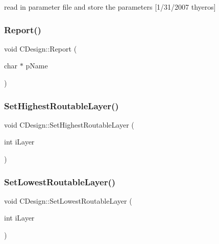 read in parameter file and store the parameters \mbox{[}1/31/2007 thyeros\mbox{]} 

\mbox{\label{classCDesign_a0cbed390d0e0c05776aed59c16f7982c}} 
\subsubsection{\texorpdfstring{Report()}{Report()}}
{\footnotesize\ttfamily void C\+Design\+::\+Report (\begin{DoxyParamCaption}\item[{char $\ast$}]{p\+Name }\end{DoxyParamCaption})}

\mbox{\label{classCDesign_a4dda519df38cb104e804522f76d826fe}} 
\subsubsection{\texorpdfstring{SetHighestRoutableLayer()}{SetHighestRoutableLayer()}}
{\footnotesize\ttfamily void C\+Design\+::\+Set\+Highest\+Routable\+Layer (\begin{DoxyParamCaption}\item[{int}]{i\+Layer }\end{DoxyParamCaption})}

\mbox{\label{classCDesign_af7d386170d501eb471b63b2f663690b0}} 
\subsubsection{\texorpdfstring{SetLowestRoutableLayer()}{SetLowestRoutableLayer()}}
{\footnotesize\ttfamily void C\+Design\+::\+Set\+Lowest\+Routable\+Layer (\begin{DoxyParamCaption}\item[{int}]{i\+Layer }\end{DoxyParamCaption})}

\mbox{\label{classCDesign_afc3a5c7e4453c76a44eec25c38c72135}} 
